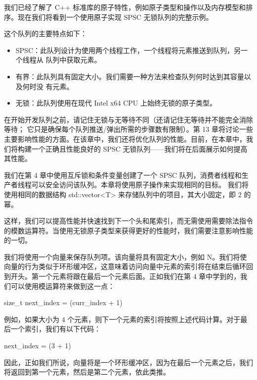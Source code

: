 
我们已经了解了 C++ 标准库的原子特性，例如原子类型和操作以及内存模型和排序。现在我们将看到一个使用原子实现 SPSC 无锁队列的完整示例。

这个队列的主要特点如下：

\begin{itemize}
\item
SPSC：此队列设计为使用两个线程工作，一个线程将元素推送到队列，另一个线程从
队列中获取元素。

\item
有界：此队列具有固定大小。我们需要一种方法来检查队列何时达到其容量以及何时没
有元素。

\item
无锁：此队列使用在现代 Intel x64 CPU 上始终无锁的原子类型。
\end{itemize}

在开始开发队列之前，请记住无锁与无等待不同（还请记住无等待并不能完全消除等待； 它只是确保每个队列推送/弹出所需的步骤数有限制）。第 13 章将讨论一些主要影响性能的方面。在该章中，我们还将优化队列的性能。目前，在本章中，我们将构建一个正确且性能良好的 SPSC 无锁队列——我们将在后面展示如何提高其性能。

我们在第 4 章中使用互斥锁和条件变量创建了一个 SPSC 队列，消费者线程和生产者线程可以安全访问该队列。本章将使用原子操作来实现相同的目标。
我们将使用相同的数据结构 std::vector<T> 来存储队列中的项目，其大小固定，即 2 的幂。

这样，我们可以提高性能并快速找到下一个头和尾索引，而无需使用需要除法指令的模数运算符。当使用无锁原子类型来获得更好的性能时，我们需要注意影响性能的一切。


我们将使用一个向量来保存队列项。该向量将具有固定大小，例如 N。我们将使向量的行为类似于环形缓冲区，这意味着访问向量中元素的索引将在结束后循环回到开头。第一个元素将跟在最后一个元素后面。正如我们在第 4 章中学到的，我们可以使用模运算符来做到这一点：

\begin{cpp}
size_t next_index = (curr_index + 1) %
\end{cpp}

例如，如果大小为 4 个元素，则下一个元素的索引将按照上述代码计算。对于最后一个索引，我们有以下代码：

\begin{cpp}
next_index = (3 + 1) %
\end{cpp}

因此，正如我们所说，向量将是一个环形缓冲区，因为在最后一个元素之后，我们将返回到第一个元素，然后是第二个元素，依此类推。

